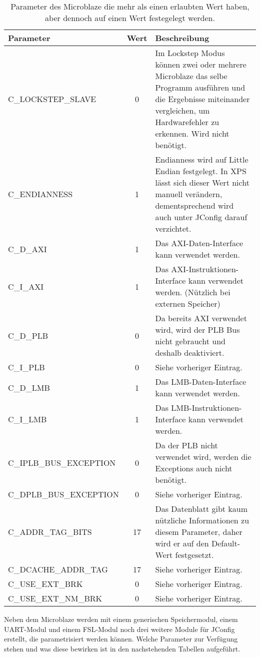 \begin{table}[ht!]
	\begin{tabular}{|l|c|p{10cm}|}
		\hline \textbf{Parameter} & \textbf{Wert} & \textbf{Beschreibung} \\ 
		\hline C\_LOCKSTEP\_SLAVE & 0 & Im Lockstep Modus können zwei oder mehrere \newline Microblaze das selbe Programm ausführen und die Ergebnisse miteinander vergleichen, um Hardwarefehler zu erkennen. Wird nicht benötigt.\\ 
		\hline C\_ENDIANNESS & 1 & Endianness wird auf Little Endian festgelegt. In XPS lässt sich dieser Wert nicht manuell verändern, dementsprechend wird auch unter JConfig darauf verzichtet.\\ 
		\hline C\_D\_AXI & 1 & Das AXI-Daten-Interface kann verwendet werden. \\ 
		\hline C\_I\_AXI & 1 & Das AXI-Instruktionen-Interface kann verwendet werden. (Nützlich bei externen Speicher) \\ 
		\hline C\_D\_PLB & 0 & Da bereits AXI verwendet wird, wird der PLB Bus nicht gebraucht und deshalb deaktiviert. \\ 
		\hline C\_I\_PLB & 0 & Siehe vorheriger Eintrag. \\ 
		\hline C\_D\_LMB & 1 & Das LMB-Daten-Interface kann verwendet werden. \\ 
		\hline C\_I\_LMB & 1 & Das LMB-Instruktionen-Interface kann verwendet werden. \\ 
		\hline C\_IPLB\_BUS\_EXCEPTION & 0 & Da der PLB nicht verwendet wird, werden die Exceptions auch nicht benötigt. \\ 
		\hline C\_DPLB\_BUS\_EXCEPTION & 0 & Siehe vorheriger Eintrag. \\ 
		\hline C\_ADDR\_TAG\_BITS & 17 & Das Datenblatt gibt kaum nützliche Informationen zu diesem Parameter, daher wird er auf den Default-Wert festgesetzt. \\ 
		\hline C\_DCACHE\_ADDR\_TAG & 17 & Siehe vorheriger Eintrag. \\ 
		\hline C\_USE\_EXT\_BRK & 0 & Siehe vorheriger Eintrag. \\ 
		\hline C\_USE\_EXT\_NM\_BRK & 0 & Siehe vorheriger Eintrag. \\ 
		\hline 
	\end{tabular}
	\centering
	\caption{Parameter des Microblaze die mehr als einen erlaubten Wert haben, aber dennoch auf einen Wert festegelegt werden.}
	\label{tab:MicParam}
\end{table}
Neben dem Microblaze werden mit einem generischen Speichermodul, einem UART-Modul und einem FSL-Modul noch drei weitere Module für JConfig erstellt, die parametrisiert werden können. Welche Parameter zur Verfügung stehen und was diese bewirken ist in den nachstehenden Tabellen aufgeführt.

